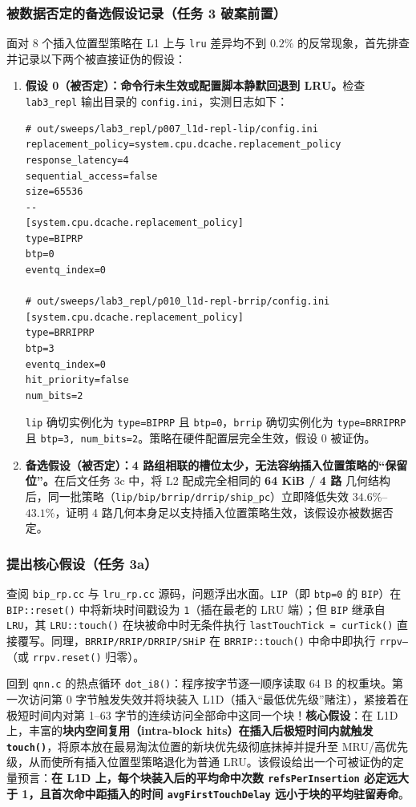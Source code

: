 \documentclass[12pt,a4paper,fontset=mac]{ctexart}
\begin{document}
\subsubsection{被数据否定的备选假设记录（任务 3 破案前置）}
面对 8 个插入位置型策略在 L1 上与 \texttt{lru} 差异均不到 $0.2\%$ 的反常现象，首先排查并记录以下两个被直接证伪的假设：
\begin{enumerate}
  \item \textbf{假设 0（被否定）：命令行未生效或配置脚本静默回退到 LRU。}检查 \texttt{lab3\_repl} 输出目录的 \texttt{config.ini}，实测日志如下：
  \begin{lstlisting}[language={},caption={验证 LIP 与 BRRIP 在 L1D 确实生效的 config.ini 片段}]
# out/sweeps/lab3_repl/p007_l1d-repl-lip/config.ini
replacement_policy=system.cpu.dcache.replacement_policy
response_latency=4
sequential_access=false
size=65536
--
[system.cpu.dcache.replacement_policy]
type=BIPRP
btp=0
eventq_index=0

# out/sweeps/lab3_repl/p010_l1d-repl-brrip/config.ini
[system.cpu.dcache.replacement_policy]
type=BRRIPRP
btp=3
eventq_index=0
hit_priority=false
num_bits=2
  \end{lstlisting}
  \texttt{lip} 确切实例化为 \texttt{type=BIPRP} 且 \texttt{btp=0}，\texttt{brrip} 确切实例化为 \texttt{type=BRRIPRP} 且 \texttt{btp=3, num\_bits=2}。策略在硬件配置层完全生效，假设 0 被证伪。
  \item \textbf{备选假设（被否定）：4 路组相联的槽位太少，无法容纳插入位置策略的“保留位”。}在后文任务 3c 中，将 L2 配成完全相同的 \textbf{64 KiB / 4 路} 几何结构后，同一批策略（\texttt{lip/bip/brrip/drrip/ship\_pc}）立即降低失效 $34.6\%$--$43.1\%$，证明 4 路几何本身足以支持插入位置策略生效，该假设亦被数据否定。
\end{enumerate}

\subsubsection{提出核心假设（任务 3a）}
查阅 \texttt{bip\_rp.cc} 与 \texttt{lru\_rp.cc} 源码，问题浮出水面。\texttt{LIP}（即 \texttt{btp=0} 的 \texttt{BIP}）在 \texttt{BIP::reset()} 中将新块时间戳设为 \texttt{1}（插在最老的 LRU 端）；但 \texttt{BIP} 继承自 \texttt{LRU}，其 \texttt{LRU::touch()} 在块被命中时无条件执行 \texttt{lastTouchTick = curTick()} 直接覆写。同理，\texttt{BRRIP/RRIP/DRRIP/SHiP} 在 \texttt{BRRIP::touch()} 中命中即执行 \texttt{rrpv--}（或 \texttt{rrpv.reset()} 归零）。

回到 \texttt{qnn.c} 的热点循环 \texttt{dot\_i8()}：程序按字节逐一顺序读取 64 B 的权重块。第一次访问第 0 字节触发失效并将块装入 L1D（插入“最低优先级”赌注），紧接着在极短时间内对第 1--63 字节的连续访问全部命中这同一个块！\textbf{核心假设}：在 L1D 上，丰富的\textbf{块内空间复用（intra-block hits）在插入后极短时间内就触发 \texttt{touch()}}，将原本放在最易淘汰位置的新块优先级彻底抹掉并提升至 MRU/高优先级，从而使所有插入位置型策略退化为普通 LRU。该假设给出一个可被证伪的定量预言：\textbf{在 L1D 上，每个块装入后的平均命中次数 \texttt{refsPerInsertion} 必定远大于 1，且首次命中距插入的时间 \texttt{avgFirstTouchDelay} 远小于块的平均驻留寿命}。
\end{document}
